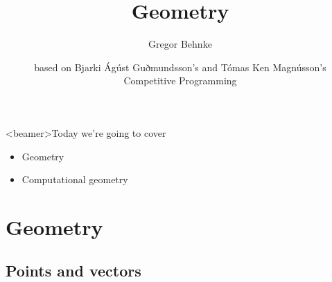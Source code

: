 \documentclass[12pt,t]{beamer}
\title{Geometry}
\author{Gregor Behnke}
\institute{Institute of Artificial Intelligence\\ Ulm University}
\date{\tiny based on Bjarki Ágúst Guðmundsson's and Tómas Ken Magnússon's\\Competitive Programming}
\newcommand{\bi}{\begin{itemize}}
\newcommand{\ei}{\end{itemize}}
\begin{document}
{
    \frame{
        \titlepage
    }
}


\begin{frame}<beamer>{Today we're going to cover}
    \vspace{40pt}
    \bi
      \item Geometry
      \item Computational geometry
    \ei
\end{frame}

\section{Geometry}
\subsection{Points and vectors}
\end{document}
